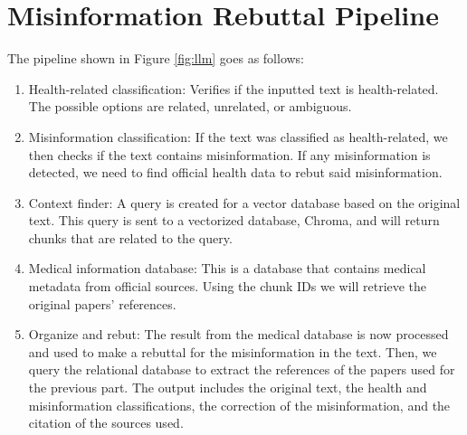 \section{Misinformation Rebuttal Pipeline}

The pipeline shown in Figure \ref{fig:llm} goes as follows:

\begin{enumerate}
	\item Health-related classification: Verifies if the inputted text is health-related. The possible options are related, unrelated, or ambiguous.
	\item Misinformation classification: If the text was classified as health-related, we then checks if the text contains misinformation. If any misinformation is detected, we need to find official health data to rebut said misinformation.
	\item	Context finder: A query is created for a vector database based on the original text. This query is sent to a vectorized database, Chroma, and will return chunks that are related to the query.
	\item	Medical information database:  This is a database that contains medical metadata from official sources. Using the chunk IDs we will retrieve the original papers' references.
	\item	Organize and rebut: The result from the medical database is now processed and used to make a rebuttal for the misinformation in the text. Then, we query the relational database to extract the references of the papers used for the previous part.
	The output includes the original text, the health and misinformation classifications, the correction of the misinformation, and the citation of the sources used. 
\end{enumerate}

